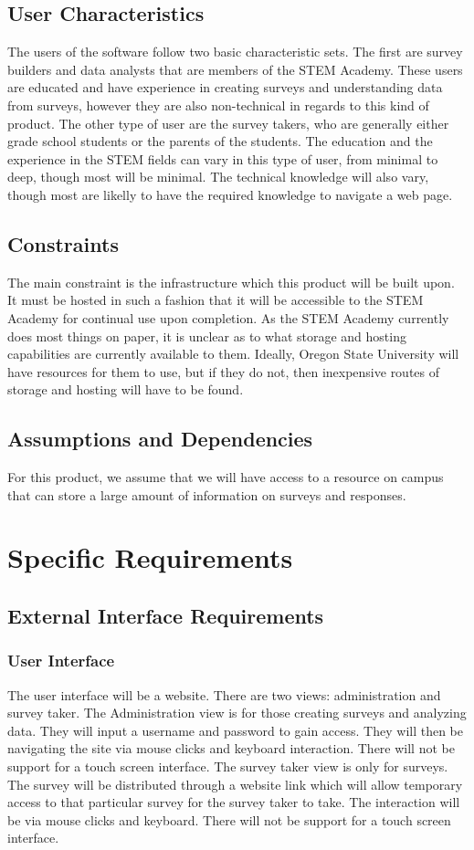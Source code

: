 \documentclass[letterpaper,10pt,serif, draftclsnofoot,onecolumn, compsoc, titlepage]{IEEEtran}
\begin{document}
\subsection{User Characteristics}
The users of the software follow two basic characteristic sets. The first are survey builders and data analysts that are members of the
STEM Academy. These users are educated and have experience in creating surveys and understanding data from surveys,
however they are also non-technical in regards to this kind of product. The other type of user are the survey takers, who are
generally either grade school students or the parents of the students. The education and the experience in the STEM fields
can vary in this type of user, from minimal to deep, though most will be minimal. The technical knowledge will also vary, though
most are likelly to have the required knowledge to navigate a web page.
\subsection{Constraints}
The main constraint is the infrastructure which this product will be built upon. It must be hosted in such a fashion that it will
be accessible to the STEM Academy for continual use upon completion. As the STEM Academy currently does most things on
paper, it is unclear as to what storage and hosting capabilities are currently available to them. Ideally, Oregon State University
will have resources for them to use, but if they do not, then inexpensive routes of storage and hosting will have to be found. 
\subsection{Assumptions and Dependencies}
For this product, we assume that we will have access to a resource on campus that can store a large amount of information on
surveys and responses. 
\section{Specific Requirements}

\subsection{External Interface Requirements}

\subsubsection{User Interface}
The user interface will be a website. There are two views: administration and survey taker. 
The Administration view is for those creating surveys and analyzing data. They will input a 
username and password to gain access. They will then be navigating the site via mouse clicks 
and keyboard interaction. There will not be support for a touch screen interface. The survey
taker view is only for surveys. The survey will be distributed through a website link which 
will allow temporary access to that particular survey for the survey taker to take. The 
interaction will be via mouse clicks and keyboard. There will not be support for a touch screen
interface.
\end{document}
